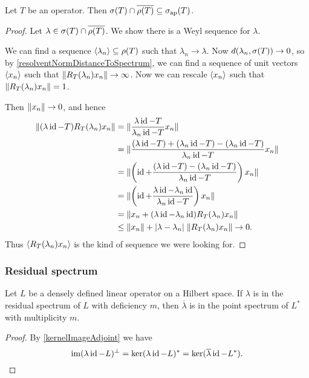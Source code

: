 \begin{corollary}
Let $T$ be an operator. Then $\sigma(T)\cap \overline{\rho(T)} \subseteq \sigma_\text{ap}(T)$.
\end{corollary}
\begin{proof}
Let $\lambda \in \sigma(T)\cap \overline{\rho(T)}$. We show there is a Weyl sequence for $\lambda$.

We can find a sequence $\left\langle \lambda_n \right\rangle\subseteq \rho(T)$ such that $\lambda_n \to \lambda$.
Now $d(\lambda_n, \sigma(T)) \to 0$, so by \ref{resolventNormDistanceToSpectrum}, we can find a sequence of unit vectors $\left\langle x_n \right\rangle$ such that $\lVert R_T(\lambda_n)x_n\rVert \to \infty$. Now we can rescale $\left\langle x_n \right\rangle$ such that $\lVert R_T(\lambda_n)x_n\rVert = 1$.

Then $\lVert x_n\rVert\to 0$, and hence
\begin{align*}
\lVert(\lambda\operatorname{id} - T)R_T(\lambda_n)x_n\rVert &= \lVert\frac{\lambda\operatorname{id} - T}{\lambda_n\operatorname{id} - T}x_n\rVert \\
&= \lVert\frac{(\lambda\operatorname{id} - T) + (\lambda_n\operatorname{id} - T) - (\lambda_n\operatorname{id} - T)}{\lambda_n\operatorname{id} - T}x_n\rVert \\
&= \lVert\left(\operatorname{id} + \frac{(\lambda\operatorname{id} - T) - (\lambda_n\operatorname{id} - T)}{\lambda_n\operatorname{id} - T}\right)x_n\rVert \\
&= \lVert\left(\operatorname{id} + \frac{\lambda\operatorname{id} - \lambda_n\operatorname{id}}{\lambda_n\operatorname{id} - T}\right)x_n\rVert \\
&= \lVert x_n + (\lambda\operatorname{id} - \lambda_n\operatorname{id})R_T(\lambda_n)x_n\rVert \\
&\leq \lVert x_n\rVert + |\lambda - \lambda_n|\;\lVert R_T(\lambda_n)x_n\rVert \to 0.
\end{align*}
Thus $\left\langle R_T(\lambda_n)x_n \right\rangle$ is the kind of sequence we were looking for.
\end{proof}


\subsubsection{Residual spectrum}
\begin{proposition}
Let $L$ be a densely defined linear operator on a Hilbert space. If $\lambda$ is in the residual spectrum of $L$ with deficiency $m$, then $\overline{\lambda}$ is in the point spectrum of $L^*$ with multiplicity $m$.
\end{proposition}
\begin{proof}
By \ref{kernelImageAdjoint} we have
\[ \operatorname{im}(\lambda \operatorname{id} - L)^\perp = \ker(\lambda\operatorname{id} - L)^* = \ker(\overline{\lambda}\operatorname{id} - L^*). \]
\end{proof}

